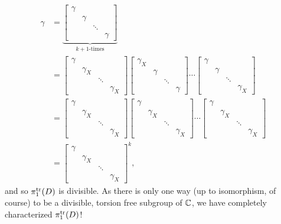 \begin{align*}
  \gamma &= \underbrace{\begin{bmatrix} \gamma &&&\\ &\gamma&\\&&\ddots\\&&&\gamma\end{bmatrix}}_{k+1\textrm{-times}}\\
    &=\begin{bmatrix} \gamma &&&\\ &\gamma_X&\\&&\ddots\\&&&\gamma_X\end{bmatrix}
      \begin{bmatrix} \gamma_X &&&\\ &\gamma&\\&&\ddots\\&&&\gamma\end{bmatrix}\cdots
      \begin{bmatrix} \gamma &&&\\ &\gamma&\\&&\ddots\\&&&\gamma_X\end{bmatrix}\\
    &=\begin{bmatrix} \gamma &&&\\ &\gamma_X&\\&&\ddots\\&&&\gamma_X\end{bmatrix}
      \begin{bmatrix} \gamma &&&\\ &\gamma_X&\\&&\ddots\\&&&\gamma_X\end{bmatrix}\cdots
      \begin{bmatrix} \gamma &&&\\ &\gamma_X&\\&&\ddots\\&&&\gamma_X\end{bmatrix}\\
    &=\begin{bmatrix} \gamma &&&\\ &\gamma_X&\\&&\ddots\\&&&\gamma_X\end{bmatrix}^k,
\end{align*}
and so \(\pi_1^{\operatorname{tr}}(D)\) is divisible. As there is only one way (up to
isomorphism, of course) to be a divisible, torsion free subgroup of \(\mathbb{C}\), we
have completely characterized \(\pi_1^{\operatorname{tr}}(D)\)!

